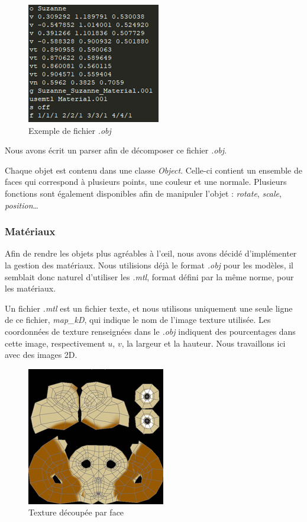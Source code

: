                 \begin{figure}[h]
                    \centering
                    \includegraphics[scale=0.8]{img/rendu/obj.png}
                    \caption{Exemple de fichier \emph{.obj}}
                    \label{fig:obj}
                \end{figure}
                Nous avons écrit un parser afin de décomposer ce fichier \emph{.obj}.

                Chaque objet est contenu dans une classe \emph{Object}. Celle-ci contient un ensemble de faces qui correspond à plusieurs points, une couleur et une normale. Plusieurs fonctions sont également disponibles afin de manipuler l'objet : \emph{rotate}, \emph{scale}, \emph{position}\dots

            \subsubsection{Matériaux}
            \label{subsubsec:materiaux}

            Afin de rendre les objets plus agréables à l'\oe il, nous avons décidé d'implémenter la gestion des matériaux. Nous utilisions déjà le format \emph{.obj} pour les modèles, il semblait donc naturel d'utiliser les \emph{.mtl}, format défini par la même norme, pour les matériaux. 

            Un fichier \emph{.mtl} est un fichier texte, et nous utilisons uniquement une seule ligne de ce fichier, \emph{map\_kD}, qui indique le nom de l'image texture utilisée. Les coordonnées de texture renseignées dans le \emph{.obj} indiquent des pourcentages dans cette image, respectivement $u$, $v$, la largeur et la hauteur. Nous travaillons ici avec des images 2D.

            \begin{figure}[h]
                \centering
                \includegraphics[scale=0.8]{img/rendu/texture.png}
                \caption{Texture découpée par face}
                \label{fig:texture}
            \end{figure}

